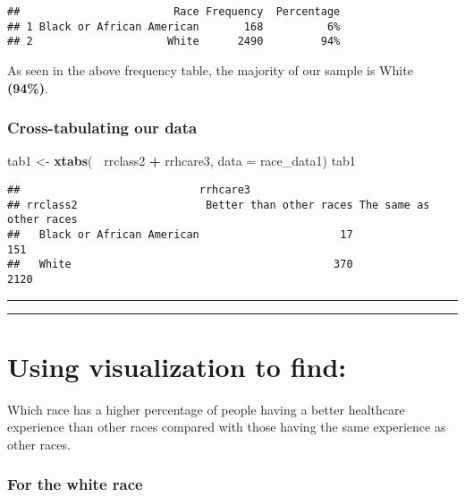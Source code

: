 \documentclass[]{article}
\newenvironment{Shaded}{\begin{snugshade}}{\end{snugshade}}
\newcommand{\DataTypeTok}[1]{\textcolor[rgb]{0.13,0.29,0.53}{#1}}
\newcommand{\KeywordTok}[1]{\textcolor[rgb]{0.13,0.29,0.53}{\textbf{#1}}}
\newcommand{\NormalTok}[1]{#1}
\newcommand{\OperatorTok}[1]{\textcolor[rgb]{0.81,0.36,0.00}{\textbf{#1}}}
\newcommand{\StringTok}[1]{\textcolor[rgb]{0.31,0.60,0.02}{#1}}
\begin{document}
\begin{verbatim}
##                        Race Frequency  Percentage
## 1 Black or African American       168          6%
## 2                     White      2490         94%
\end{verbatim}

As seen in the above frequency table, the majority of our sample is
White \textbf{(94\%)}.

\hypertarget{cross-tabulating-our-data}{%
\subsubsection{Cross-tabulating our
data}\label{cross-tabulating-our-data}}

\begin{Shaded}
\begin{Highlighting}[]
\NormalTok{tab1 <-}\StringTok{ }\KeywordTok{xtabs}\NormalTok{(}\OperatorTok{~}\StringTok{ }\NormalTok{rrclass2 }\OperatorTok{+}\StringTok{ }\NormalTok{rrhcare3, }\DataTypeTok{data =}\NormalTok{ race_data1)}
\NormalTok{tab1}
\end{Highlighting}
\end{Shaded}

\begin{verbatim}
##                            rrhcare3
## rrclass2                    Better than other races The same as other races
##   Black or African American                      17                     151
##   White                                         370                    2120
\end{verbatim}

\begin{center}\rule{0.5\linewidth}{\linethickness}\end{center}

\begin{center}\rule{0.5\linewidth}{\linethickness}\end{center}

\hypertarget{using-visualization-to-find}{%
\section{Using visualization to
find:}\label{using-visualization-to-find}}

Which race has a higher percentage of people having a better healthcare
experience than other races compared with those having the same
experience as other races.

\hypertarget{for-the-white-race}{%
\subsubsection{For the white race}\label{for-the-white-race}}
\end{document}
